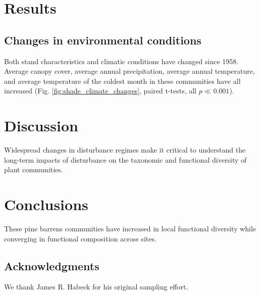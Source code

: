 \section*{Results}
\subsection*{Changes in environmental conditions}
Both stand characteristics and climatic conditions have changed since 1958. Average canopy cover, average annual precipitation, average annual temperature, and average temperature of the coldest month in these communities have all increased (Fig. \ref{fig:shade_climate_changes}, paired t-tests, all $p\ll0.001$).

\section*{Discussion}
Widespread changes in disturbance regimes make it critical to understand the long-term impacts of disturbance on the taxonomic and functional diversity of plant communities.

\section*{Conclusions}
These pine barrens communities have increased in local functional diversity while converging in functional composition across sites.

\subsection*{Acknowledgments }
We thank James R. Habeck for his original sampling effort.

\clearpage{}
\begin{onehalfspace}


\end{onehalfspace}

\clearpage{}

\setcounter{table}{0}
\setcounter{figure}{0}

